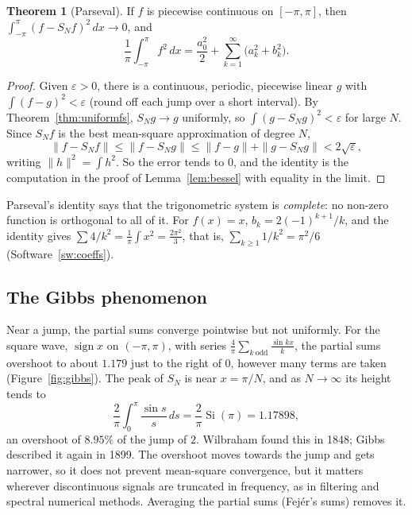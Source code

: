 \documentclass[11pt,a4paper]{article}
\numberwithin{equation}{section}
\theoremstyle{definition}
\newtheorem{thm}{Theorem}[subsection]
\begin{document}
\begin{thm}[Parseval]
\label{thm:parseval}
If $f$ is piecewise continuous on $[-\pi, \pi]$, then $\int_{-\pi}^\pi(f - S_Nf)^2\,dx \to 0$, and
\[
\frac1\pi\int_{-\pi}^\pi f^2\,dx = \frac{a_0^2}2 + \sum_{k = 1}^\infty\bigl(a_k^2 + b_k^2\bigr) .
\]
\end{thm}

\begin{proof}
Given $\varepsilon > 0$, there is a continuous, periodic, piecewise linear $g$ with $\int(f - g)^2 < \varepsilon$ (round off each jump over a short interval). By Theorem~\ref{thm:uniformfs}, $S_Ng \to g$ uniformly, so $\int(g - S_Ng)^2 < \varepsilon$ for large $N$. Since $S_Nf$ is the best mean-square approximation of degree $N$,
\[
\|f - S_Nf\| \leq \|f - S_Ng\| \leq \|f - g\| + \|g - S_Ng\| < 2\sqrt\varepsilon ,
\]
writing $\|h\|^2 = \int h^2$. So the error tends to $0$, and the identity is the computation in the proof of Lemma~\ref{lem:bessel} with equality in the limit.
\end{proof}

Parseval's identity says that the trigonometric system is \emph{complete}: no non-zero function is orthogonal to all of it. For $f(x) = x$, $b_k = 2(-1)^{k + 1}/k$, and the identity gives $\sum 4/k^2 = \frac1\pi\int x^2 = \frac{2\pi^2}3$, that is, $\sum_{k \geq 1}1/k^2 = \pi^2/6$ (Software~\ref{sw:coeffs}).

\subsection{The Gibbs phenomenon}
\label{ssec:gibbs}

Near a jump, the partial sums converge pointwise but not uniformly. For the square wave, $\operatorname{sign}x$ on $(-\pi, \pi)$, with series $\frac4\pi\sum_{k\ \text{odd}}\frac{\sin kx}k$, the partial sums overshoot to about $1.179$ just to the right of $0$, however many terms are taken (Figure~\ref{fig:gibbs}). The peak of $S_N$ is near $x = \pi/N$, and as $N \to \infty$ its
height tends to
\[
\frac2\pi\int_0^\pi\frac{\sin s}s\,ds = \frac2\pi\operatorname{Si}(\pi) = 1.17898 ,
\]
an overshoot of $8.95\%$ of the jump of $2$. Wilbraham found this in 1848; Gibbs described it again in 1899. The overshoot moves towards the jump and gets narrower, so it does not prevent mean-square convergence, but it matters wherever discontinuous signals are truncated in frequency, as in filtering and
spectral numerical methods. Averaging the partial sums (Fej\'er's sums) removes it.
\end{document}
